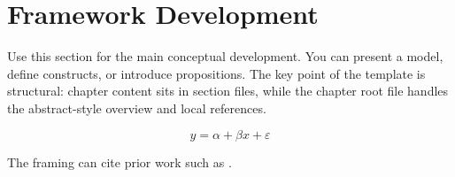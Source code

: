 \section{Framework Development}

Use this section for the main conceptual development. You can present a model, define constructs, or introduce propositions. The key point of the template is structural: chapter content sits in section files, while the chapter root file handles the abstract-style overview and local references.

\begin{equation}
  y = \alpha + \beta x + \varepsilon
\end{equation}

The framing can cite prior work such as \textcite{doe2026}.
